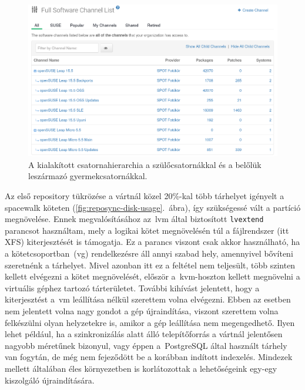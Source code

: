 \begin{figure}[ht]
	\centering
	\includegraphics[width=15cm]{figures/uyuni-channel-hierarchy.png}
	\caption{A kialakított csatornahierarchia a szülőcsatornákkal és a belőlük leszármazó gyermekcsatornákkal.}
	\label{fig:software-channel-hierarchy}
\end{figure}

Az első repository tükrözése a vártnál közel 20\%-kal több tárhelyet igényelt a spacewalk köteten (\ref{fig:reposync-disk-usage}.~ábra), így szükségessé vált a partíció megnövelése. Ennek megvalósításához az~\acrshort{lvm} által biztosított \texttt{lvextend} parancsot használtam, mely a logikai kötet megnövelésén túl a fájlrendszer (itt XFS) kiterjesztését is támogatja. Ez a parancs viszont csak akkor használható, ha a kötetcsoportban~(\acrshort{vg}) rendelkezésre áll annyi szabad hely, amennyivel bővíteni szeretnénk a tárhelyet. Mivel azonban itt ez a feltétel nem teljesült, több szinten kellett elvégezni a kötet megnövelését, először a~\acrshort{kvm}-hoszton kellett megnövelni a virtuális géphez tartozó tárterületet. További kihívást jelentett, hogy a kiterjesztést a~\acrshort{vm} leállítása nélkül szerettem volna elvégezni. Ebben az esetben nem jelentett volna nagy gondot a gép újraindítása, viszont szerettem volna felkészülni olyan helyzetekre is, amikor a gép leállítása nem megengedhető. Ilyen lehet például, ha a szinkronizálás alatt álló telepítőforrás a vártnál jelentősen nagyobb méretűnek bizonyul, vagy éppen a~PostgreSQL által használt tárhely van fogytán, de még nem fejeződött be a korábban indított indexelés. Mindezek mellett általában éles környezetben is korlátozottak a lehetőségeink egy-egy kiszolgáló újraindítására.

